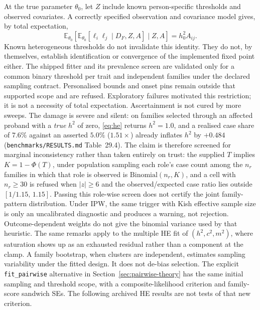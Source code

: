 \documentclass[11pt,a4paper]{article}
\newcommand{\E}{\mathbb{E}}
\newcommand{\h}{h^{2}}
\begin{document}
At the true parameter $\theta_0$, let $Z$ include known person-specific
thresholds and observed covariates. A correctly specified observation and
covariance model gives, by total expectation,
\begin{equation}
 \E_{\theta_0}\!\left[\E_{\theta_0}[\ell_i\ell_j\mid D_F,Z,A]
                  \mid Z,A\right]=\h_0 A_{ij}.
 \label{eq:augmented-moment}
\end{equation}
Known heterogeneous thresholds do not invalidate this identity. They do not,
by themselves, establish identification or convergence of the implemented
fixed point either. The shipped fitter and its prevalence screen are validated
only for a common binary threshold per trait and independent families under
the declared sampling contract. Personalised bounds and onset pins remain
outside that supported scope and are refused. Exploratory failures motivated
this restriction; it is not a necessity of total expectation.
Ascertainment is not cured by more sweeps.
The damage is severe and silent: on families selected through an
affected proband with a \emph{true} $\h$ of zero, \eqref{eq:he}
returns $\h=1.0$, and a realised case share of $7.6\%$ against an
asserted $5.0\%$ ($1.51\times$) already inflates $\h$ by $+0.484$
(\texttt{benchmarks/RESULTS.md} Table~29.4).
The claim is therefore screened for marginal inconsistency rather
than taken entirely on trust: the supplied
$T$ implies $K=1-\Phi(T)$, under population sampling each role's
case count among the $n_r$ families in which that role is observed
is $\mathrm{Binomial}(n_r,K)$, and a
cell with $n_r\ge 30$ is refused when $|z|\ge 6$ and the
observed/expected case ratio lies outside $[1/1.15,\,1.15]$.
Passing this role-wise screen does not certify
the joint family-pattern distribution. Under IPW, the same trigger with
Kish effective sample size is only an uncalibrated diagnostic and produces
a warning, not rejection. Outcome-dependent weights do not give the
binomial variance used by that heuristic.
The same remarks apply to the multiple HE fit of $(\h,c^{2},m^{2})$,
where saturation shows up as an exhausted residual rather than a
component at the clamp.
A family bootstrap, when clusters are independent, estimates
sampling variability under the fitted design.
It does not de-bias selection.
The explicit \texttt{fit\_pairwise} alternative in
Section~\ref{sec:pairwise-theory} has the same initial sampling and threshold
scope, with a composite-likelihood criterion and family-score sandwich SEs.
The following archived HE results are not tests of that new criterion.
\end{document}
